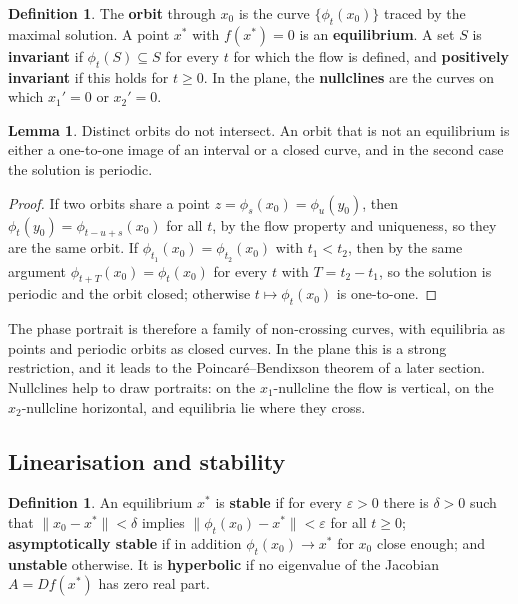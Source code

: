\documentclass[11pt,a4paper]{article}
\numberwithin{equation}{section}
\theoremstyle{definition}
\newtheorem{defn}[thm]{Definition}
\newtheorem{lem}[thm]{Lemma}
\begin{document}
\begin{defn}
The \textbf{orbit} through $x_0$ is the curve $\{\phi_t(x_0)\}$ traced by the maximal solution. A point $x^*$ with $f(x^*) = 0$ is an \textbf{equilibrium}. A set $S$ is \textbf{invariant} if $\phi_t(S) \subseteq S$ for every
$t$ for which the flow is defined, and \textbf{positively invariant} if this holds for $t \geq 0$. In the plane, the \textbf{nullclines} are the curves on which $x_1' = 0$ or $x_2' = 0$.
\end{defn}

\begin{lem}
\label{lem:orbits}
Distinct orbits do not intersect. An orbit that is not an equilibrium is either a one-to-one image of an interval or a closed curve, and in the second case the solution is periodic.
\end{lem}

\begin{proof}
If two orbits share a point $z = \phi_s(x_0) = \phi_u(y_0)$, then $\phi_t(y_0) = \phi_{t - u + s}(x_0)$ for all $t$, by the flow property and uniqueness, so they are the same orbit. If $\phi_{t_1}(x_0) = \phi_{t_2}(x_0)$ with
$t_1 < t_2$, then by the same argument $\phi_{t + T}(x_0) = \phi_t(x_0)$ for every $t$ with $T = t_2 - t_1$, so the solution is periodic and the orbit closed; otherwise $t \mapsto \phi_t(x_0)$ is one-to-one.
\end{proof}

The phase portrait is therefore a family of non-crossing curves, with equilibria as points and periodic orbits as closed curves. In the plane this is a strong restriction, and it
leads to the Poincar\'e--Bendixson theorem of a later section. Nullclines help to draw portraits: on the $x_1$-nullcline the flow is vertical, on the $x_2$-nullcline horizontal, and
equilibria lie where they cross.

\subsection{Linearisation and stability}
\label{ssec:linearisation}

\begin{defn}
An equilibrium $x^*$ is \textbf{stable} if for every $\varepsilon > 0$ there is $\delta > 0$ such that $\|x_0 - x^*\| < \delta$ implies $\|\phi_t(x_0) - x^*\| < \varepsilon$ for all $t \geq 0$; \textbf{asymptotically stable} if in
addition $\phi_t(x_0) \to x^*$ for $x_0$ close enough; and \textbf{unstable} otherwise. It is \textbf{hyperbolic} if no eigenvalue of the Jacobian $A = Df(x^*)$ has zero real part.
\end{defn}
\end{document}

